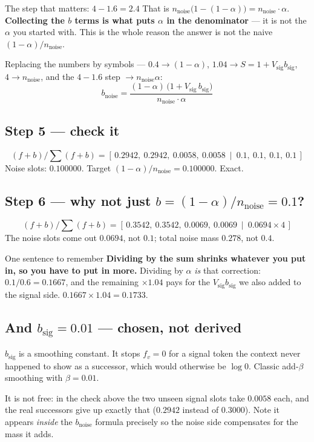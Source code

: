 \documentclass[11pt]{article}
\newcommand{\Vsig}{V_{\mathrm{sig}}}
\newcommand{\nnoise}{n_{\mathrm{noise}}}
\newcommand{\bsig}{b_{\mathrm{sig}}}
\newcommand{\bnoise}{b_{\mathrm{noise}}}
\begin{document}
\begin{interpbox}{The step that matters: $4-1.6=2.4$}
That is $\nnoise\big(1-(1-\alpha)\big)=\nnoise\cdot\alpha$. \textbf{Collecting the $b$ terms is
what puts $\alpha$ in the denominator} --- it is not the $\alpha$ you started with. This is the
whole reason the answer is not the naive $(1-\alpha)/\nnoise$.
\end{interpbox}

Replacing the numbers by symbols --- $0.4\to(1-\alpha)$, $1.04\to S=1+\Vsig\bsig$,
$4\to\nnoise$, and the $4-1.6$ step $\to\nnoise\alpha$:
\[
\boxed{\ \bnoise=\frac{(1-\alpha)\,\bigl(1+\Vsig\,\bsig\bigr)}{\nnoise\cdot\alpha}\ }
\]

\subsection{Step 5 --- check it}

\[
(f+b)/\!\sum(f+b)=[\,0.2942,\ 0.2942,\ 0.0058,\ 0.0058\ \mid\ 0.1,\ 0.1,\ 0.1,\ 0.1\,]
\]
Noise slots: $0.100000$. Target $(1-\alpha)/\nnoise=0.100000$. Exact.

\subsection{Step 6 --- why not just $b=(1-\alpha)/\nnoise=0.1$?}

\[
(f+b)/\!\sum(f+b)=[\,0.3542,\ 0.3542,\ 0.0069,\ 0.0069\ \mid\ 0.0694\times4\,]
\]
The noise slots come out $0.0694$, not $0.1$; total noise mass $0.278$, not $0.4$.

\begin{interpbox}{One sentence to remember}
\textbf{Dividing by the sum shrinks whatever you put in, so you have to put in more.} Dividing by
$\alpha$ \emph{is} that correction: $0.1/0.6=0.1667$, and the remaining $\times1.04$ pays for the
$\Vsig\bsig$ we also added to the signal side. $0.1667\times1.04=0.1733$.
\end{interpbox}

\subsection{And $\bsig=0.01$ --- chosen, not derived}

$\bsig$ is a smoothing constant. It stops $f_v=0$ for a signal token the context never happened to
show as a successor, which would otherwise be $\log 0$. Classic add-$\beta$ smoothing with
$\beta=0.01$.

It is not free: in the check above the two unseen signal slots take $0.0058$ each, and the real
successors give up exactly that ($0.2942$ instead of $0.3000$). Note it appears \emph{inside} the
$\bnoise$ formula precisely so the noise side compensates for the mass it adds.
\end{document}
